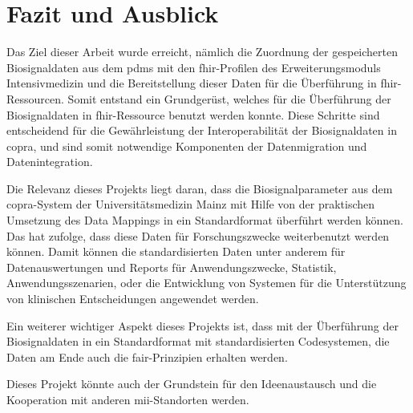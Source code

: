 \chapter{Fazit und Ausblick} \label{ch:conclussion}

Das Ziel dieser Arbeit wurde erreicht, nämlich die Zuordnung der gespeicherten Biosignaldaten aus dem \ac{pdms} mit den \ac{fhir}-Profilen des Erweiterungsmoduls \glqq Intensivmedizin\grqq{} und die Bereitstellung dieser Daten für die Überführung in \ac{fhir}-Ressourcen. Somit entstand ein Grundgerüst, welches für die Überführung der Biosignaldaten in \ac{fhir}-Ressource benutzt werden konnte. Diese Schritte sind entscheidend für die Gewährleistung der Interoperabilität der Biosignaldaten in \ac{copra}, und sind somit notwendige Komponenten der Datenmigration und Datenintegration.

Die Relevanz dieses Projekts liegt daran, dass die Biosignalparameter aus dem \ac{copra}-System der Universitätsmedizin Mainz mit Hilfe von der praktischen Umsetzung des Data Mappings in ein Standardformat überführt werden können. Das hat zufolge, dass diese Daten für Forschungszwecke weiterbenutzt werden können. Damit können die standardisierten Daten unter anderem für Datenauswertungen und Reports für Anwendungszwecke, Statistik, Anwendungsszenarien, oder die Entwicklung von Systemen für die Unterstützung von klinischen Entscheidungen angewendet werden.

Ein weiterer wichtiger Aspekt dieses Projekts ist, dass mit der Überführung der Biosignaldaten in ein Standardformat mit standardisierten Codesystemen, die Daten am Ende auch die \ac{fair}-Prinzipien erhalten werden.

Dieses Projekt könnte auch der Grundstein für den Ideenaustausch und die Kooperation mit anderen \ac{mii}-Standorten werden.
